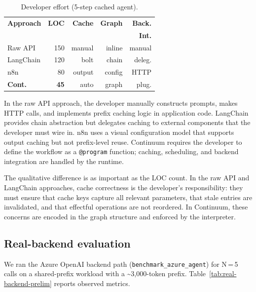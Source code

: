 \documentclass[10pt,twocolumn]{article}
\begin{document}
\begin{table}[t]
\centering
{\small
\caption{Developer effort (5-step cached agent).}
\label{tab:developer-effort}
\begin{tabular}{@{}lrrrr@{}}
\toprule
\textbf{Approach} & \textbf{LOC} & \textbf{Cache} & \textbf{Graph} & \textbf{Back.} \\
 & & & & \textbf{Int.} \\
\midrule
Raw API         & 150 & manual & inline & manual \\
LangChain       & 120 & bolt   & chain  & deleg. \\
n8n             &  80 & output & config & HTTP \\
\textbf{Cont.}  & \textbf{45} & auto & graph & plug. \\
\bottomrule
\end{tabular}
}
\end{table}

In the raw API approach, the developer manually constructs prompts, makes HTTP calls, and implements prefix caching logic in application code. LangChain provides chain abstraction but delegates caching to external components that the developer must wire in. n8n uses a visual configuration model that supports output caching but not prefix-level reuse. Continuum requires the developer to define the workflow as a \texttt{@program} function; caching, scheduling, and backend integration are handled by the runtime.

The qualitative difference is as important as the LOC count. In the raw API and LangChain approaches, cache correctness is the developer's responsibility: they must ensure that cache keys capture all relevant parameters, that stale entries are invalidated, and that effectful operations are not reordered. In Continuum, these concerns are encoded in the graph structure and enforced by the interpreter.

\subsection{Real-backend evaluation}

We ran the Azure OpenAI backend path (\texttt{benchmark\_azure\_agent}) for N\,=\,5 calls on a shared-prefix workload with a \textasciitilde3,000-token prefix. Table~\ref{tab:real-backend-prelim} reports observed metrics.
\end{document}
